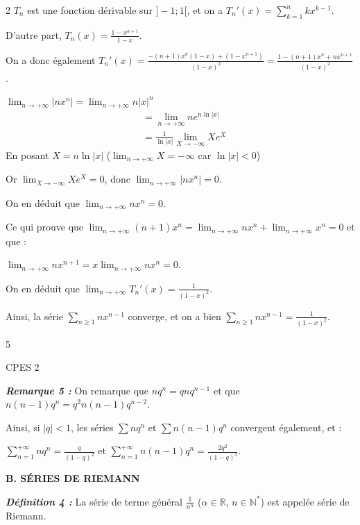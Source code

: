 \documentclass[10pt,a4paper]{article}
\begin{document}
\begin{multicols}{2}
$T_n$ est une fonction dérivable sur $]-1; 1[$, et on a $T_n'(x) = \sum_{k=1}^n k x^{k-1}$.

D'autre part, $T_n(x) = \frac{1-x^{n+1}}{1-x}$.

On a donc également $T_n'(x) = \frac{-(n+1)x^n(1-x)+(1-x^{n+1})}{(1-x)^2} = \frac{1-(n+1)x^n+n x^{n+1}}{(1-x)^2}$.

$\lim_{n \to +\infty} |n x^n| = \lim_{n \to +\infty} n |x|^n$
\begin{align*}
&= \lim_{n \to +\infty} n e^{n \ln |x|} \\
&= \frac{1}{\ln |x|} \lim_{X \to -\infty} X e^X
\end{align*}
En posant $X = n \ln |x|$ ($\lim_{n \to +\infty} X = -\infty$ car $\ln |x| < 0$)

Or $\lim_{X \to -\infty} X e^X = 0$, donc $\lim_{n \to +\infty} |n x^n| = 0$.

On en déduit que $\lim_{n \to +\infty} n x^n = 0$.

Ce qui prouve que $\lim_{n \to +\infty} (n+1) x^n = \lim_{n \to +\infty} n x^n + \lim_{n \to +\infty} x^n = 0$ et que :

$\lim_{n \to +\infty} n x^{n+1} = x \lim_{n \to +\infty} n x^n = 0$.

On en déduit que $\lim_{n \to +\infty} T_n'(x) = \frac{1}{(1-x)^2}$.

Ainsi, la série $\sum_{n \ge 1} n x^{n-1}$ converge, et on a bien $\sum_{n \ge 1} n x^{n-1} = \frac{1}{(1-x)^2}$.

\vfill
\centerline{\footnotesize 5}

\newpage

\begin{flushright}
\footnotesize CPES 2
\end{flushright}
\vspace{-0.2cm}

\textbf{\textit{Remarque 5 :}} On remarque que $n q^n = q n q^{n-1}$ et que $n(n-1) q^n = q^2 n(n-1) q^{n-2}$.

Ainsi, si $|q| < 1$, les séries $\sum n q^n$ et $\sum n(n-1) q^n$ convergent également, et :

$\sum_{n=1}^{+\infty} n q^n = \frac{q}{(1-q)^2}$ et $\sum_{n=1}^{+\infty} n(n-1) q^n = \frac{2 q^2}{(1-q)^3}$.

\vspace{0.1cm}
\textbf{\textcolor{maingreen}{B. SÉRIES DE RIEMANN}}

\textbf{\textit{Définition 4 :}} La série de terme général $\frac{1}{n^\alpha}$ ($\alpha \in \mathbb{R}$, $n \in \mathbb{N}^*$) est appelée série de Riemann.


\end{multicols}
\end{document}
